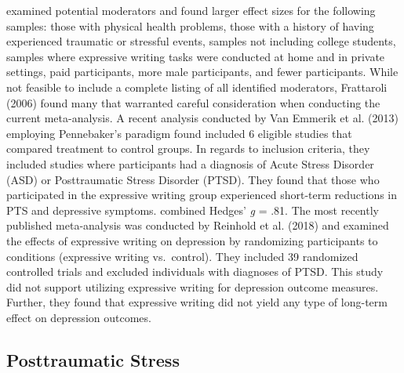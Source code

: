 \documentclass[english,man, mask]{apa6}
\theoremstyle{definition}
\theoremstyle{definition}
\theoremstyle{definition}
\theoremstyle{remark}
\begin{document}
examined potential moderators and found larger effect sizes for the
following samples: those with physical health problems, those with a
history of having experienced traumatic or stressful events, samples not
including college students, samples where expressive writing tasks were
conducted at home and in private settings, paid participants, more male
participants, and fewer participants. While not feasible to include a
complete listing of all identified moderators, Frattaroli (2006) found
many that warranted careful consideration when conducting the current
meta-analysis. A recent analysis conducted by Van Emmerik et al. (2013)
employing Pennebaker's paradigm found included 6 eligible studies that
compared treatment to control groups. In regards to inclusion criteria,
they included studies where participants had a diagnosis of Acute Stress
Disorder (ASD) or Posttraumatic Stress Disorder (PTSD). They found that
those who participated in the expressive writing group experienced
short-term reductions in PTS and depressive symptoms. combined Hedges'
\emph{g} = .81. The most recently published meta-analysis was conducted
by Reinhold et al. (2018) and examined the effects of expressive writing
on depression by randomizing participants to conditions (expressive
writing vs.~control). They included 39 randomized controlled trials and
excluded individuals with diagnoses of PTSD. This study did not support
utilizing expressive writing for depression outcome measures. Further,
they found that expressive writing did not yield any type of long-term
effect on depression outcomes.

\subsection{Posttraumatic Stress}\label{posttraumatic-stress}
\end{document}
